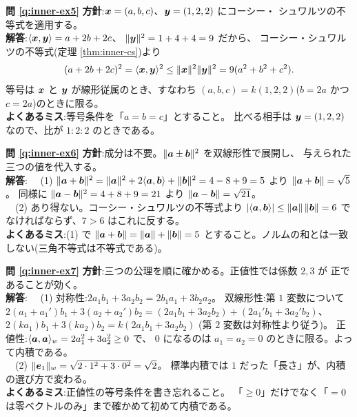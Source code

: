 \bigskip
\noindent\textbf{問 \ref{q:inner-ex5}}\quad
\textbf{方針}:$\bm{x} = (a, b, c)$、$\bm{y} = (1, 2, 2)$ にコーシー・
シュワルツの不等式を適用する。\\
\textbf{解答}:$\langle \bm{x}, \bm{y} \rangle = a + 2b + 2c$、
$\|\bm{y}\|^2 = 1 + 4 + 4 = 9$ だから、
コーシー・シュワルツの不等式(定理 \ref{thm:inner-cs})より
\[
(a + 2b + 2c)^2 = \langle \bm{x}, \bm{y} \rangle^2
\le \|\bm{x}\|^2\|\bm{y}\|^2 = 9(a^2 + b^2 + c^2).
\]
等号は $\bm{x}$ と $\bm{y}$ が線形従属のとき、すなわち
$(a, b, c) = k(1, 2, 2)$($b = 2a$ かつ $c = 2a$)のときに限る。\\
\textbf{よくあるミス}:等号条件を「$a = b = c$」とすること。
比べる相手は $\bm{y} = (1, 2, 2)$ なので、比が $1 : 2 : 2$ のときである。

\bigskip
\noindent\textbf{問 \ref{q:inner-ex6}}\quad
\textbf{方針}:成分は不要。$\|\bm{a} \pm \bm{b}\|^2$ を双線形性で展開し、
与えられた三つの値を代入する。\\
\textbf{解答}:
　(1) $\|\bm{a} + \bm{b}\|^2 = \|\bm{a}\|^2
+ 2\langle \bm{a}, \bm{b} \rangle + \|\bm{b}\|^2
= 4 - 8 + 9 = 5$ より $\|\bm{a} + \bm{b}\| = \sqrt{5}$。
同様に $\|\bm{a} - \bm{b}\|^2 = 4 + 8 + 9 = 21$ より
$\|\bm{a} - \bm{b}\| = \sqrt{21}$。\\
　(2) あり得ない。コーシー・シュワルツの不等式より
$|\langle \bm{a}, \bm{b} \rangle| \le \|\bm{a}\|\,\|\bm{b}\| = 6$
でなければならず、$7 > 6$ はこれに反する。\\
\textbf{よくあるミス}:(1) で $\|\bm{a} + \bm{b}\| = \|\bm{a}\| + \|\bm{b}\| = 5$
とすること。ノルムの和とは一致しない(三角不等式は不等式である)。

\bigskip
\noindent\textbf{問 \ref{q:inner-ex7}}\quad
\textbf{方針}:三つの公理を順に確かめる。正値性では係数 $2, 3$ が
正であることが効く。\\
\textbf{解答}:
　(1) 対称性:$2a_1b_1 + 3a_2b_2 = 2b_1a_1 + 3b_2a_2$。
双線形性:第 $1$ 変数について
$2(a_1 + a_1')b_1 + 3(a_2 + a_2')b_2
= (2a_1b_1 + 3a_2b_2) + (2a_1'b_1 + 3a_2'b_2)$、
$2(ka_1)b_1 + 3(ka_2)b_2 = k(2a_1b_1 + 3a_2b_2)$
(第 $2$ 変数は対称性より従う)。
正値性:$\langle \bm{a}, \bm{a} \rangle_w = 2a_1^2 + 3a_2^2 \ge 0$ で、
$0$ になるのは $a_1 = a_2 = 0$ のときに限る。よって内積である。\\
　(2) $\|\bm{e}_1\|_w = \sqrt{2 \cdot 1^2 + 3 \cdot 0^2} = \sqrt{2}$。
標準内積では $1$ だった「長さ」が、内積の選び方で変わる。\\
\textbf{よくあるミス}:正値性の等号条件を書き忘れること。
「$\ge 0$」だけでなく「$= 0$ は零ベクトルのみ」まで確かめて初めて内積である。

